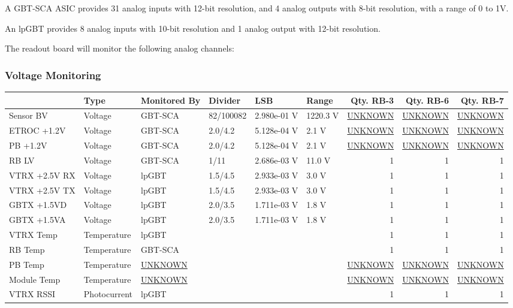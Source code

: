 \documentclass[11pt]{article}
\begin{document}
A GBT-SCA ASIC provides 31 analog inputs with 12-bit resolution, and 4 analog outputs with 8-bit resolution, with a range of 0 to 1V.

An lpGBT provides 8 analog inputs with 10-bit resolution and 1 analog output with 12-bit resolution.

The readout board will monitor the following analog channels:

\subsubsection{Voltage Monitoring}
\label{sec:org62a8231}
\begin{center}
\begin{tabular}{llllllrrr}
 & Type & Monitored By & Divider & LSB & Range & Qty. RB-3 & Qty. RB-6 & Qty. RB-7\\
\hline
Sensor BV & Voltage & GBT-SCA & 82/100082 & 2.980e-01 V & 1220.3 V & \uline{UNKNOWN} & \uline{UNKNOWN} & \uline{UNKNOWN}\\
ETROC +1.2V & Voltage & GBT-SCA & 2.0/4.2 & 5.128e-04 V & 2.1 V & \uline{UNKNOWN} & \uline{UNKNOWN} & \uline{UNKNOWN}\\
PB +1.2V & Voltage & GBT-SCA & 2.0/4.2 & 5.128e-04 V & 2.1 V & \uline{UNKNOWN} & \uline{UNKNOWN} & \uline{UNKNOWN}\\
RB LV & Voltage & GBT-SCA & 1/11 & 2.686e-03 V & 11.0 V & 1 & 1 & 1\\
VTRX +2.5V RX & Voltage & lpGBT & 1.5/4.5 & 2.933e-03 V & 3.0 V & 1 & 1 & 1\\
VTRX +2.5V TX & Voltage & lpGBT & 1.5/4.5 & 2.933e-03 V & 3.0 V & 1 & 1 & 1\\
GBTX +1.5VD & Voltage & lpGBT & 2.0/3.5 & 1.711e-03 V & 1.8 V & 1 & 1 & 1\\
GBTX +1.5VA & Voltage & lpGBT & 2.0/3.5 & 1.711e-03 V & 1.8 V & 1 & 1 & 1\\
VTRX Temp & Temperature & lpGBT &  &  &  & 1 & 1 & 1\\
RB Temp & Temperature & GBT-SCA &  &  &  & 1 & 1 & 1\\
PB Temp & Temperature & \uline{UNKNOWN} &  &  &  & \uline{UNKNOWN} & \uline{UNKNOWN} & \uline{UNKNOWN}\\
Module Temp & Temperature & \uline{UNKNOWN} &  &  &  & \uline{UNKNOWN} & \uline{UNKNOWN} & \uline{UNKNOWN}\\
VTRX RSSI & Photocurrent & lpGBT &  &  &  & 1 & 1 & 1\\
\end{tabular}
\end{center}
\end{document}
